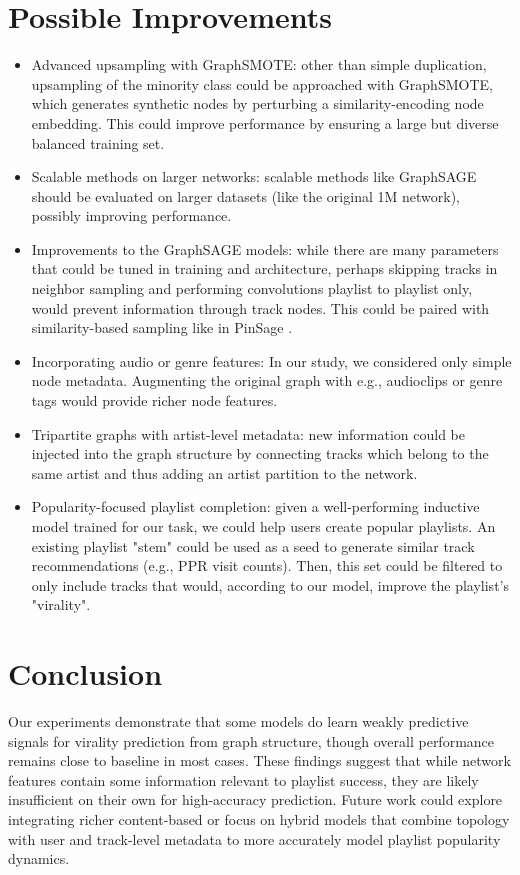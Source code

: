 \documentclass[9pt,twocolumn,twoside]{pnas-report}
\begin{document}
\section{Possible Improvements}
\begin{itemize}
    \item Advanced upsampling with GraphSMOTE: other than simple duplication, upsampling of the minority class could be approached with GraphSMOTE, which generates synthetic nodes by perturbing a similarity-encoding node embedding. This could improve performance by ensuring a large but diverse balanced training set.
    \item Scalable methods on larger networks: scalable methods like GraphSAGE should be evaluated on larger datasets (like the original 1M network), possibly improving performance.
    \item Improvements to the GraphSAGE models: while there are many parameters that could be tuned in training and architecture, perhaps skipping tracks in neighbor sampling and performing convolutions playlist to playlist only, would prevent information through track nodes. This could be paired with similarity-based sampling like in PinSage \cite{ying2018graph}.
    \item Incorporating audio or genre features: In our study, we considered only simple node metadata. Augmenting the original graph with e.g., audioclips or genre tags would provide richer node features.
    \item Tripartite graphs with artist-level metadata: new information could be injected into the graph structure by connecting tracks which belong to the same artist and thus adding an artist partition to the network.
    \item Popularity-focused playlist completion: given a well-performing inductive model trained for our task, we could help users create popular playlists. An existing playlist "stem" could be used as a seed to generate similar track recommendations (e.g., PPR visit counts). Then, this set could be filtered to only include tracks that would, according to our model, improve the playlist's "virality". 
\end{itemize}

\section{Conclusion}
Our experiments demonstrate that some models do learn weakly predictive signals for virality prediction from graph structure, though overall performance remains close to baseline in most cases. These findings suggest that while network features contain some information relevant to playlist success, they are likely insufficient on their own for high-accuracy prediction. Future work could explore integrating richer content-based or focus on hybrid models that combine topology with user and track-level metadata to more accurately model playlist popularity dynamics.

\nocite{bevec2025spotify}



\end{document}
